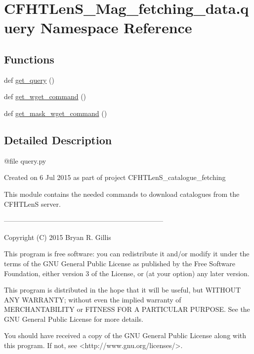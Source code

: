 \hypertarget{namespaceCFHTLenS__Mag__fetching__data_1_1query}{}\section{C\+F\+H\+T\+Len\+S\+\_\+\+Mag\+\_\+fetching\+\_\+data.\+query Namespace Reference}
\label{namespaceCFHTLenS__Mag__fetching__data_1_1query}
\subsection*{Functions}
\begin{DoxyCompactItemize}
\item 
def \hyperlink{namespaceCFHTLenS__Mag__fetching__data_1_1query_aa42cfb67904470afd2b83ba1de3f6296}{get\+\_\+query} ()
\item 
def \hyperlink{namespaceCFHTLenS__Mag__fetching__data_1_1query_a7582c1993ad3ffea26798327f655ee7e}{get\+\_\+wget\+\_\+command} ()
\item 
def \hyperlink{namespaceCFHTLenS__Mag__fetching__data_1_1query_a757575b5b6a1a1b6e6a90820e90a476d}{get\+\_\+mask\+\_\+wget\+\_\+command} ()
\end{DoxyCompactItemize}


\subsection{Detailed Description}
\begin{DoxyVerb}@file query.py

    Created on 6 Jul 2015 as part of project CFHTLenS_catalogue_fetching
    
    This module contains the needed commands to download catalogues from
    the CFHTLenS server.

    ---------------------------------------------------------------------

    Copyright (C) 2015  Bryan R. Gillis

    This program is free software: you can redistribute it and/or modify
     it under the terms of the GNU General Public License as published by
     the Free Software Foundation, either version 3 of the License, or
     (at your option) any later version.

     This program is distributed in the hope that it will be useful,
     but WITHOUT ANY WARRANTY; without even the implied warranty of
     MERCHANTABILITY or FITNESS FOR A PARTICULAR PURPOSE.  See the
     GNU General Public License for more details.

    You should have received a copy of the GNU General Public License
    along with this program.  If not, see <http://www.gnu.org/licenses/>.\end{DoxyVerb}
 

